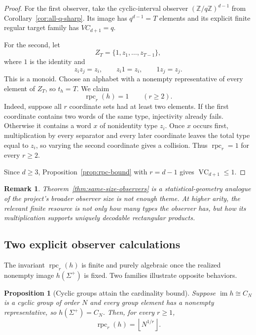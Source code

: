 \documentclass[11pt]{article}
\newtheorem{proposition}[theorem]{Proposition}
\newtheorem{remark}[theorem]{Remark}
\newcommand{\VC}{\operatorname{VC}}
\begin{document}
\begin{proof}
For the first observer, take the cyclic-interval observer
\((\mathbb Z/q\mathbb Z)^{d-1}\) from
Corollary~\ref{cor:all-q-sharp}. Its image has \(q^{d-1}=T\) elements
and its explicit finite regular target family has \(VC_{d+1}=q\).

For the second, let
\[
 Z_T=\{1,z_1,\ldots,z_{T-1}\},
\]
where \(1\) is the identity and
\[
 z_i z_j=z_i,\qquad z_i1=z_i,\qquad 1z_j=z_j.
\]
This is a monoid. Choose an alphabet with a nonempty representative of every
element of \(Z_T\), so \(t_h=T\). We claim
\[
 \operatorname{rpc}_r(h)=1\qquad(r\ge2).
\]
Indeed, suppose all \(r\) coordinate sets had at least two elements. If the
first coordinate contains two words of the same type, injectivity already
fails. Otherwise it contains a word \(x\) of nonidentity type \(z_i\).
Once \(x\) occurs first, multiplication by every separator and every later
coordinate leaves the total type equal to \(z_i\), so varying the second
coordinate gives a collision. Thus \(\operatorname{rpc}_r=1\) for every
\(r\ge2\).

Since \(d\ge3\), Proposition~\ref{prop:rpc-bound} with \(r=d-1\) gives
\(\VC_{d+1}\le1\).
\end{proof}

\begin{remark}
Theorem~\ref{thm:same-size-observers} is a statistical-geometry analogue of
the project's broader \emph{observer size is not enough} theme. At higher
arity, the relevant finite resource is not only how many types the observer
has, but how its multiplication supports uniquely decodable rectangular
products.
\end{remark}


\subsection{Two explicit observer calculations}

The invariant \(\operatorname{rpc}_r(h)\) is finite and purely algebraic once
the realized nonempty image \(h(\Sigma^+)\) is fixed.  Two families illustrate
opposite behaviors.

\begin{proposition}[Cyclic groups attain the cardinality bound]
\label{prop:rpc-cyclic}
Suppose \(\operatorname{im}h\cong C_N\) is a cyclic group of order \(N\) and
every group element has a nonempty representative, so
\(h(\Sigma^+)=C_N\). Then, for every \(r\ge1\),
\[
 \operatorname{rpc}_r(h)=\left\lfloor N^{1/r}\right\rfloor.
\]
\end{proposition}
\end{document}
